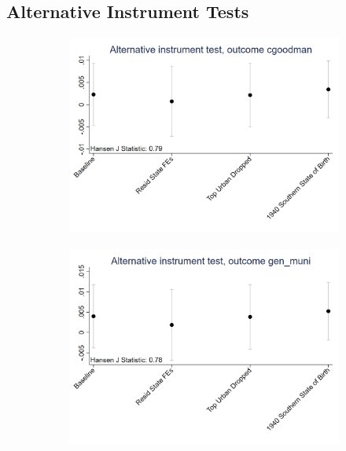 \documentclass{article}
\begin{document}
\subsection{Alternative Instrument Tests}
\begin{figure}[htbp]
    \centering
    \begin{subfigure}{0.3\textwidth}
        \includegraphics[width=\linewidth]{exhibits_old/figures/exogeneity_tests/D16_alt_inst_pooled_cgoodman.png}
        \label{fig:sub1}
    \end{subfigure}
    \begin{subfigure}{0.3\textwidth}
        \includegraphics[width=\linewidth]{exhibits_old/figures/exogeneity_tests/D16_alt_inst_pooled_gen_muni.png}

\end{subfigure}
\end{figure}
\end{document}
